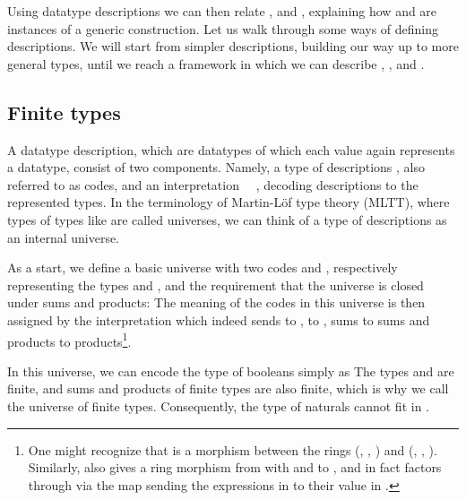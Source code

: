 Using datatype descriptions we can then relate \bN{},  and , explaining how  and  are instances of a generic construction. Let us walk through some ways of defining descriptions. We will start from simpler descriptions, building our way up to more general types, until we reach a framework in which we can describe \bN{}, ,  and . 


\subsection{Finite types}\label{ssec:background-fin}
A datatype description, which are datatypes of which each value again represents a datatype, consist of two components. Namely, a type of descriptions , also referred to as codes, and an interpretation \ \ , decoding descriptions to the represented types. In the terminology of Martin-L{\"{o}}f type theory (MLTT)\cite{levitation}, %
where types of types like  are called universes, we can think of a type of descriptions as an internal universe.

As a start, we define a basic universe with two codes  and , respectively representing the types  and , and the requirement that the universe is closed under sums and products:
The meaning of the codes in this universe is then assigned by the interpretation
which indeed sends  to ,  to , sums to sums and products to products\footnote{One might recognize that  is a morphism between the rings (, , ) and (, , ). Similarly,  also gives a ring morphism from \bN{} with \AF{+} and  to , and in fact  factors through  via the map sending the expressions in  to their value in \bN{}.}.

In this universe, we can encode the type of booleans simply as 
The types  and  are finite, and sums and products of finite types are also finite, which is why we call  the universe of finite types. Consequently, the type of naturals \bN{} cannot fit in .

